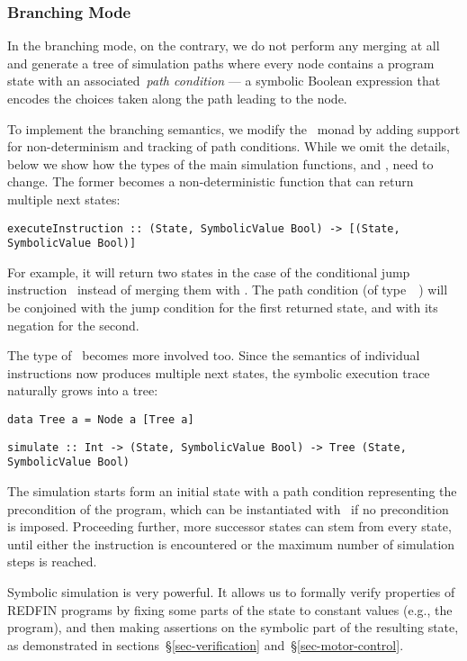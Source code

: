 \subsubsection{Branching Mode}

In the branching mode, on the contrary, we do not perform any merging at all and
generate a tree of simulation paths where every node contains a program state
with an associated~\emph{path condition} --- a symbolic Boolean expression
that encodes the choices taken along the path leading to the node.

To implement the branching semantics, we modify the~ monad by adding
support for non-determinism and tracking of path conditions. While we omit
the details, below we show how the types of the main simulation functions,
 and , need to change. The former becomes a
non-deterministic function that can return multiple next states:

\begin{verbatim}
executeInstruction :: (State, SymbolicValue Bool) -> [(State, SymbolicValue Bool)]
\end{verbatim}

\noindent
For example, it will return two states in the case of the conditional jump
instruction~ instead of merging them with . The path
condition (of type~~) will be conjoined with the jump
condition for the first returned state, and with its negation for the second.

The type of~ becomes more involved too. Since the semantics of
individual instructions now produces multiple next states, the symbolic
execution trace naturally grows into a tree:

\begin{verbatim}
data Tree a = Node a [Tree a]
\end{verbatim}
\begin{verbatim}
simulate :: Int -> (State, SymbolicValue Bool) -> Tree (State, SymbolicValue Bool)
\end{verbatim}

\noindent
The simulation starts form an initial state with a path condition representing
the precondition of the program, which can be instantiated with~ if no
precondition is imposed. Proceeding further, more successor states can stem from
every state, until either the  instruction is encountered or the maximum
number of simulation steps is reached.

Symbolic simulation is very powerful. It allows us to formally verify properties
of REDFIN programs by fixing some parts of the state to constant values (e.g.,
the program), and then making assertions on the symbolic part of the resulting
state, as demonstrated in sections~\S\ref{sec-verification}
and~\S\ref{sec-motor-control}.
